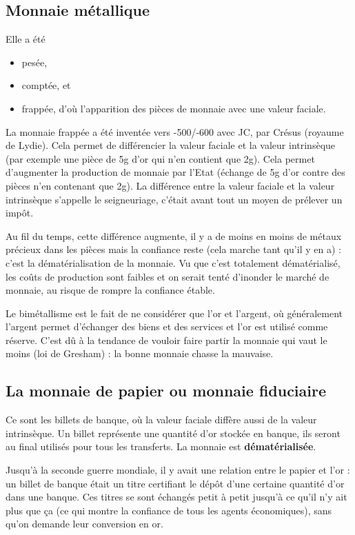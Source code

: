 	\subsection{Monnaie métallique}
		
	Elle a été
		
	\begin{itemize}
		\item pesée,
		\item comptée, et
		\item frappée, d'où l'apparition des pièces de monnaie avec une valeur faciale.
	\end{itemize}
		
	La monnaie frappée a été inventée vers -500/-600 avec JC, par Crésus (royaume de Lydie). Cela permet de différencier la valeur faciale et la valeur intrinsèque (par exemple une pièce de 5g d'or qui n'en contient que 2g). Cela permet d'augmenter la production de monnaie par l'Etat (échange de 5g d'or contre des pièces n'en contenant que 2g). La différence entre la valeur faciale et la valeur intrinsèque s'appelle le seigneuriage, c'était avant tout un moyen de prélever un impôt.
		
	Au fil du temps, cette différence augmente, il y a de moins en moins de métaux précieux dans les pièces mais la confiance reste (cela marche tant qu'il y en a) : c'est la dématérialisation de la monnaie. Vu que c'est totalement dématérialisé, les coûts de production sont faibles et on serait tenté d'inonder le marché de monnaie, au risque de rompre la confiance étable.
		
	Le bimétallisme est le fait de ne considérer que l'or et l'argent, où généralement l'argent permet d'échanger des biens et des services et l'or est utilisé comme réserve. C'est dû à la tendance de vouloir faire partir la monnaie qui vaut le moins (loi de Gresham) : la bonne monnaie chasse la mauvaise.
		
	\subsection{La monnaie de papier ou monnaie fiduciaire}
		
		Ce sont les billets de banque, où la valeur faciale diffère aussi de la valeur intrinsèque. Un billet représente une quantité d'or stockée en banque, ils seront au final utilisés pour tous les transferts. La monnaie est \textbf{dématérialisée}.
		
		Jusqu'à la seconde guerre mondiale, il y avait une relation entre le papier et l'or : un billet de banque était un titre certifiant le dépôt d'une certaine quantité d'or dans une banque. Ces titres se sont échangés petit à petit jusqu'à ce qu'il n'y ait plus que ça (ce qui montre la confiance de tous les agents économiques), sans qu'on demande leur conversion en or.
		
